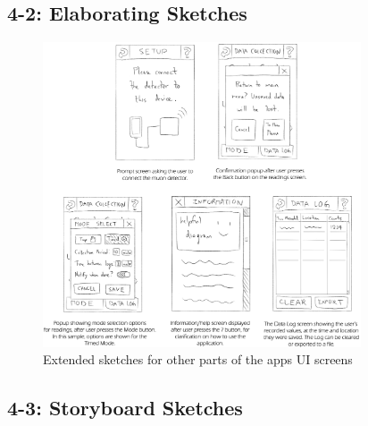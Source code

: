 \documentclass[11pt,a4paper]{article}
\begin{document}
\subsection*{4-2: Elaborating Sketches}
\def\textfraction{.01}
\def\topfraction{.99}
\bigskip
\begin{figure}[b!]
  \centering
  \hspace*{-1cm}
  \renewcommand{\textfraction}{0.05} 
      \includegraphics[width=0.84\textwidth]{elaboratingsketches.png}
  \caption{Extended sketches for other parts of the apps UI screens}
\end{figure}

\newpage
\subsection*{4-3: Storyboard Sketches}
\end{document}
